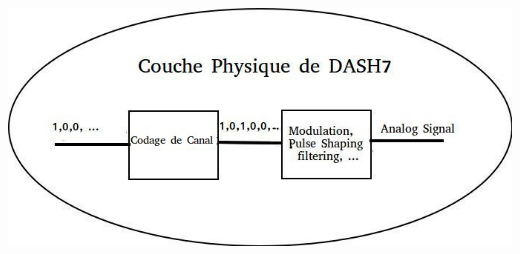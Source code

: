\documentclass[8pt]{beamer}
\newcommand{\1}{\mathbbm 1}
\begin{document}
\begin{frame}
\begin{center}
\includegraphics[scale=0.48]{figures/physique.jpg}
\end{center}

\end{frame}
\end{document}
